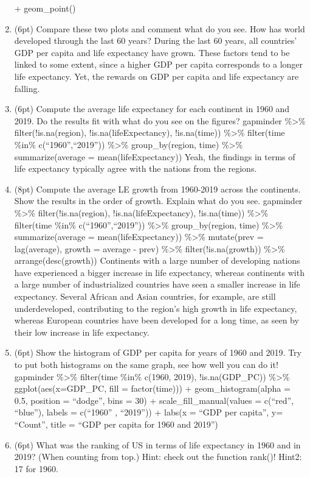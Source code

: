 \documentclass[]{article}
\begin{document}
\begin{enumerate}
  + geom\_point()
\item
  (6pt) Compare these two plots and comment what do you see. How has
  world developed through the last 60 years? During the last 60 years,
  all countries' GDP per capita and life expectancy have grown. These
  factors tend to be linked to some extent, since a higher GDP per
  capita corresponds to a longer life expectancy. Yet, the rewards on
  GDP per capita and life expectancy are falling.
\item
  (6pt) Compute the average life expectancy for each continent in 1960
  and 2019. Do the results fit with what do you see on the figures?
  gapminder \%\textgreater{}\% filter(!is.na(region),
  !is.na(lifeExpectancy), !is.na(time)) \%\textgreater{}\% filter(time
  \%in\% c(``1960'',``2019'')) \%\textgreater{}\% group\_by(region,
  time) \%\textgreater{}\% summarize(average = mean(lifeExpectancy))
  Yeah, the findings in terms of life expectancy typically agree with
  the nations from the regions.
\item
  (8pt) Compute the average LE growth from 1960-2019 across the
  continents. Show the results in the order of growth. Explain what do
  you see. gapminder \%\textgreater{}\% filter(!is.na(region),
  !is.na(lifeExpectancy), !is.na(time)) \%\textgreater{}\% filter(time
  \%in\% c(``1960'',``2019'')) \%\textgreater{}\% group\_by(region,
  time) \%\textgreater{}\% summarize(average = mean(lifeExpectancy))
  \%\textgreater{}\% mutate(prev = lag(average), growth = average -
  prev) \%\textgreater{}\% filter(!is.na(growth)) \%\textgreater{}\%
  arrange(desc(growth)) Continents with a large number of developing
  nations have experienced a bigger increase in life expectancy, whereas
  continents with a large number of industrialized countries have seen a
  smaller increase in life expectancy. Several African and Asian
  countries, for example, are still underdeveloped, contributing to the
  region's high growth in life expectancy, whereas European countries
  have been developed for a long time, as seen by their low increase in
  life expectancy.
\item
  (6pt) Show the histogram of GDP per capita for years of 1960 and 2019.
  Try to put both histograms on the same graph, see how well you can do
  it! gapminder \%\textgreater{}\% filter(time \%in\% c(1960, 2019),
  !is.na(GDP\_PC)) \%\textgreater{}\% ggplot(aes(x=GDP\_PC, fill =
  factor(time))) + geom\_histogram(alpha = 0.5, position = ``dodge'',
  bins = 30) + scale\_fill\_manual(values = c(``red'', ``blue''), labels
  = c(``1960'' , ``2019'')) + labs(x = ``GDP per capita'', y= ``Count'',
  title = ``GDP per capita for 1960 and 2019'')
\item
  (6pt) What was the ranking of US in terms of life expectancy in 1960
  and in 2019? (When counting from top.) Hint: check out the function
  rank()! Hint2: 17 for 1960.
\end{enumerate}
\end{document}
